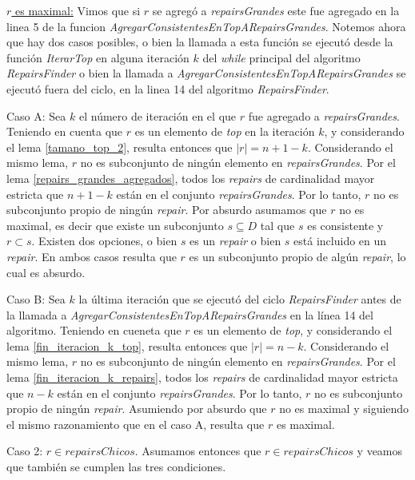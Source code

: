 \documentclass[11pt,a4paper,twoside]{tesis}
\begin{document}
\underline{$r$ es maximal:}  Vimos que si $r$ se agregó a \textit{repairsGrandes} este fue agregado en la linea 5 de la funcion \textit{AgregarConsistentesEnTopARepairsGrandes}. Notemos ahora que hay dos casos posibles, o bien la llamada a esta función se ejecutó desde la función \textit{IterarTop} en alguna iteración $k$ del \textit{while} principal del algoritmo \textit{RepairsFinder} o bien la llamada a \textit{AgregarConsistentesEnTopARepairsGrandes} se ejecutó fuera del ciclo, en la linea 14 del algoritmo \textit{RepairsFinder}.

Caso A: Sea $k$ el número de iteración en el que $r$ fue agregado a \textit{repairsGrandes}. Teniendo en cuenta que $r$ es un elemento de \textit{top} en la iteración $k$, y considerando el lema \ref{tamano_top_2}, resulta entonces que $|r| = n + 1 - k$. Considerando el mismo lema, $r$ no es subconjunto de ningún elemento en \textit{repairsGrandes}.
Por el lema \ref{repairs_grandes_agregados}, todos los \textit{repairs} de cardinalidad mayor estricta que $n + 1 - k$ están en el conjunto \textit{repairsGrandes}. Por lo tanto, $r$ no es subconjunto propio de ningún \textit{repair}. Por absurdo asumamos que $r$ no es maximal, es decir que existe un subconjunto $s \subseteq D$ tal que $s$ es consistente y $r \subset s$. Existen dos opciones, o bien $s$ es un \textit{repair} o bien $s$ está incluido en un \textit{repair}. En ambos casos resulta que $r$ es un subconjunto propio de algún \textit{repair}, lo cual es absurdo.

Caso B: Sea $k$ la última iteración que se ejecutó del ciclo \textit{RepairsFinder} antes de la llamada a \textit{AgregarConsistentesEnTopARepairsGrandes} en la línea 14 del algoritmo. Teniendo en cueneta que $r$ es un elemento de \textit{top}, y considerando el lema \ref{fin_iteracion_k_top}, resulta entonces que $|r| = n - k$. Considerando el mismo lema, $r$ no es subconjunto de ningún elemento en \textit{repairsGrandes}.
Por el lema \ref{fin_iteracion_k_repairs}, todos los \textit{repairs} de cardinalidad mayor estricta que $n - k$ están en el conjunto \textit{repairsGrandes}. Por lo tanto, $r$ no es subconjunto propio de ningún \textit{repair}. Asumiendo por absurdo que $r$ no es maximal y siguiendo el mismo razonamiento que en el caso A, resulta que $r$ es maximal.  

Caso 2: $r \in repairsChicos$. Asumamos entonces que $r \in repairsChicos$ y veamos que también se cumplen las tres condiciones.
\end{document}
